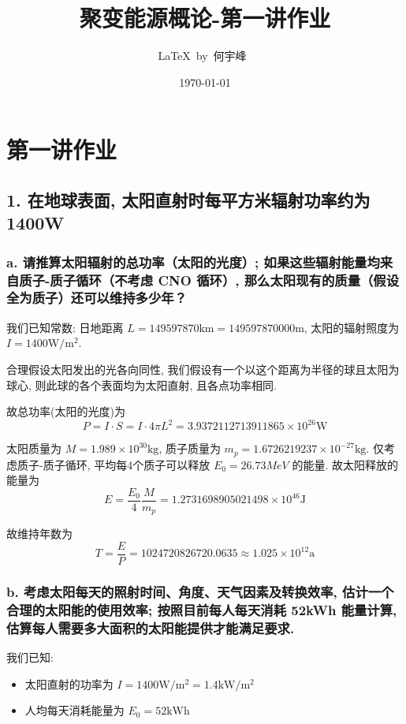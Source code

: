 \documentclass{article}
\title{聚变能源概论-第一讲作业}
\author{\LaTeX\ by\ 何宇峰\ }
\date{\today}
\begin{document}
\pagestyle{fancy}

\fancyhead[R]{\today}

\section*{第一讲作业}

\subsection*{1. 在地球表面, 太阳直射时每平方米辐射功率约为1400W}

\subsubsection*{a. 请推算太阳辐射的总功率（太阳的光度）; 如果这些辐射能量均来自质子-质子循环（不考虑 CNO 循环）, 那么太阳现有的质量（假设全为质子）还可以维持多少年？}

我们已知常数: 日地距离 $L=149597870\text{km} = 149597870000\text{m}$, 太阳的辐射照度为 $I=1400\text{W}/\text{m}^2$.

合理假设太阳发出的光各向同性, 我们假设有一个以这个距离为半径的球且太阳为球心, 则此球的各个表面均为太阳直射, 且各点功率相同. 

故总功率(太阳的光度)为
$$P = I \cdot S = I \cdot 4 \pi L^2 = 3.9372112713911865 \times 10^{26} \text{W}$$

太阳质量为 $M=1.989 \times 10^{30} \text{kg}$, 质子质量为 $m_p=1.6726219237\times 10^{-27} \text{kg}$. 仅考虑质子-质子循环, 平均每4个质子可以释放 $E_0 = 26.73 MeV$ 的能量. 故太阳释放的能量为
$$E = \frac{E_0}{4} \frac{M}{m_p} = 1.2731698905021498 \times {10}^{46} \text{J}$$

故维持年数为
$$T = \frac{E}{P} = 1024720826720.0635 \approx 1.025 \times {10}^{12} \text{a}$$

\subsubsection*{b. 考虑太阳每天的照射时间、角度、天气因素及转换效率, 估计一个合理的太阳能的使用效率; 按照目前每人每天消耗 52kWh 能量计算, 估算每人需要多大面积的太阳能提供才能满足要求. }

我们已知:
\begin{itemize}
    \item 太阳直射的功率为 $I = 1400\text{W}/\text{m}^2 = 1.4 \text{kW} / \text{m}^2$
    \item 人均每天消耗能量为 $E_0 = 52\text{kWh}$
\end{itemize}
\end{document}
